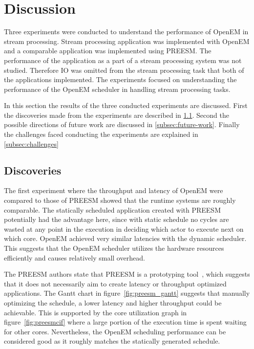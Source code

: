 \section{Discussion}
\label{sec:discussion}
Three experiments were conducted to understand the performance of OpenEM in stream processing. Stream processing application was implemented with OpenEM and a comparable application was implemented using PREESM. The performance of the application as a part of a stream processing system was not studied. Therefore IO was omitted from the stream processing task that both of the applications implemented.  The experiments focused on understanding the performance of the OpenEM scheduler in handling stream processing tasks.

In this section the results of the three conducted experiments are discussed. First the discoveries made from the experiments are described in \ref{subsec:discoveries}. Second the possible directions of future work are discussed in \ref{subsec:future-work}. Finally the challenges faced conducting the experiments are explained in \ref{subsec:challenges}

\subsection{Discoveries}
\label{subsec:discoveries}
\FloatBarrier
The first experiment where the throughput and latency of OpenEM were compared to those of PREESM showed that the runtime systems are roughly comparable. The statically scheduled application created with PREESM potentially had the advantage here, since with static schedule no cycles are wasted at any point in the execution in deciding which actor to execute next on which core. OpenEM achieved very similar latencies with the dynamic scheduler. This suggests that the OpenEM scheduler utilizes the hardware resources efficiently and causes relatively small overhead.

The PREESM authors state that PREESM is a prototyping tool~\cite{preesm}, which suggests that it does not necessarily aim to create latency or throughput optimized applications. The Gantt chart in figure~\ref{fig:preesm_gantt} suggests that manually optimizing the schedule, a lower latency and higher throughput could be achievable. This is supported by the core utilization graph in figure~\ref{fig:preesmcif} where a large portion of the execution time is spent waiting for other cores. Nevertheless, the OpenEM scheduling performance can be considered good as it roughly matches the statically generated schedule.

